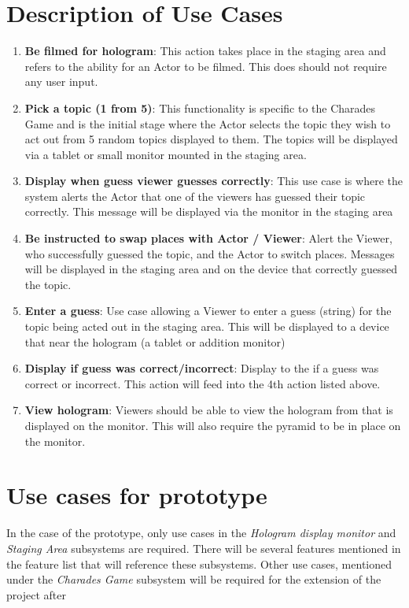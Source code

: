 \documentclass{article}
\begin{document}
\section{Description of Use Cases}
\begin{enumerate}
	\item \textbf{Be filmed for hologram}: This action takes place in the staging area and refers to the ability for an Actor to be filmed. This does should not require any user input.
	
	\item \textbf{Pick a topic (1 from 5)}: This functionality is specific to the Charades Game and is the initial stage where the Actor selects the topic they wish to act out from 5 random topics displayed to them. The topics will be displayed via a tablet or small monitor mounted in the staging area.
	
	\item \textbf{Display when guess viewer guesses correctly}: This use case is where the system alerts the Actor that one of the viewers has guessed their topic correctly. This message will be displayed via the monitor in the staging area
	
	\item \textbf{Be instructed to swap places with Actor / Viewer}: Alert the Viewer, who successfully guessed the topic, and the Actor to switch places. Messages will be displayed in the staging area and on the device that correctly guessed the topic.
	
	\item \textbf{Enter a guess}: Use case allowing a Viewer to enter a guess (string) for the topic being acted out in the staging area. This will be displayed to a device that near the hologram (a tablet or addition monitor)
	
	\item \textbf{Display if guess was correct/incorrect}: Display to the if a guess was correct or incorrect. This action will feed into the 4th action listed above.
	
	\item \textbf{View hologram}: Viewers should be able to view the hologram from that is displayed on the monitor. This will also require the pyramid to be in place on the monitor.
\end{enumerate}

\section{Use cases for prototype}
In the case of the prototype, only use cases in the \textit{Hologram display monitor} and \textit{Staging Area} subsystems are required. There will be several features mentioned in the feature list that will reference these subsystems. 
Other use cases, mentioned under the \textit{Charades Game} subsystem will be required for the extension of the project after 
\end{document}
